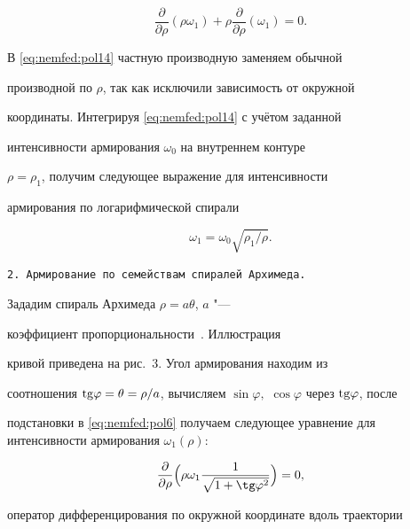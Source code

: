 \begin{equation}

\label{eq:nemfed:pol14}

\dfrac{\partial}{\partial\rho}(\rho\omega_1)+\rho\dfrac{\partial}{\partial\rho}(\omega_1)=0.

 \end{equation}

В \eqref{eq:nemfed:pol14} частную производную заменяем обычной

производной по $\rho$, так как исключили зависимость от окружной

координаты. Интегрируя \eqref{eq:nemfed:pol14} с учётом заданной

интенсивности армирования $\omega_0$ на внутреннем контуре

$\rho=\rho_1$, получим следующее выражение для интенсивности

армирования по логарифмической спирали

\begin{equation*}

\omega_1={\omega_{0}\sqrt{\rho_1/\rho}}.

\end{equation*}



\smallskip



{\tt 2. Армирование по семействам спиралей Архимеда.} 

Зададим спираль Архимеда $\rho=a\theta$, $a$ "---

коэффициент пропорциональности~\cite{nemfed:bib:gus}. Иллюстрация

кривой приведена на рис.~3. Угол армирования находим из

соотношения ${\rm tg}\varphi=\theta={\rho}/{a}$, вычисляем $\sin \varphi,$ $\cos \varphi$ через ${\rm tg\varphi}$, после

подстановки в \eqref{eq:nemfed:pol6} получаем следующее уравнение для интенсивности армирования $\omega_1(\rho)$:

\begin{equation*}

\label{eq:nemfed:pol15}

\dfrac{\partial}{\partial\rho}\Bigl(\rho\omega_1\dfrac{1}{\sqrt{1+\tg\varphi^2}}\Bigr)=0,

 \end{equation*}

оператор дифференцирования по окружной координате вдоль траектории

